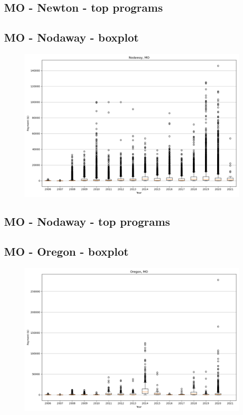 \subsection*{MO - Newton - top programs}

\newpage
\subsection*{MO - Nodaway - boxplot}
\begin{figure}[h]
\centering
\includegraphics[width=7in]{../output/boxplots/counties/Nodaway-MO_boxplot.png}
\end{figure}


\subsection*{MO - Nodaway - top programs}

\newpage
\subsection*{MO - Oregon - boxplot}
\begin{figure}[h]
\centering
\includegraphics[width=7in]{../output/boxplots/counties/Oregon-MO_boxplot.png}
\end{figure}


